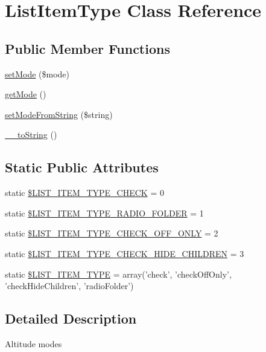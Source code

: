 \hypertarget{classListItemType}{
\section{ListItemType Class Reference}
\label{d7/d1b/classListItemType}
}
\subsection*{Public Member Functions}
\begin{DoxyCompactItemize}
\item 
\hyperlink{classListItemType_ad03178c03f309dc44760f9f9d2d4c378}{setMode} (\$mode)
\item 
\hyperlink{classListItemType_aeec44cdc8a8434c29fc7bf72d9491752}{getMode} ()
\item 
\hyperlink{classListItemType_a0fb60aa822ca51db5867d6d38d0d6fb0}{setModeFromString} (\$string)
\item 
\hyperlink{classListItemType_a8ab86e3b32efed1c39dcd7431b4ac715}{\_\-\_\-toString} ()
\end{DoxyCompactItemize}
\subsection*{Static Public Attributes}
\begin{DoxyCompactItemize}
\item 
static \hyperlink{classListItemType_a1a80aa8e0e1267039bbb82ede39d3bf3}{\$LIST\_\-ITEM\_\-TYPE\_\-CHECK} = 0
\item 
static \hyperlink{classListItemType_af5645a2a86016dfb081ac1e1f1a2e95f}{\$LIST\_\-ITEM\_\-TYPE\_\-RADIO\_\-FOLDER} = 1
\item 
static \hyperlink{classListItemType_ae84a78642e9a6f748cd8026406295eb1}{\$LIST\_\-ITEM\_\-TYPE\_\-CHECK\_\-OFF\_\-ONLY} = 2
\item 
static \hyperlink{classListItemType_a83b0cb3e54de0a470d476626a505e2d0}{\$LIST\_\-ITEM\_\-TYPE\_\-CHECK\_\-HIDE\_\-CHILDREN} = 3
\item 
static \hyperlink{classListItemType_abb10f2bfa4ee03a59aec27d6ea083a29}{\$LIST\_\-ITEM\_\-TYPE} = array('check', 'checkOffOnly', 'checkHideChildren', 'radioFolder')
\end{DoxyCompactItemize}


\subsection{Detailed Description}
Altitude modes 

